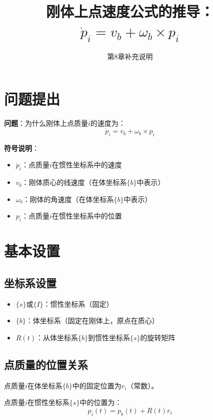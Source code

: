 \documentclass[12pt,a4paper]{article}
\title{刚体上点速度公式的推导：$\dot{p}_i = v_b + \omega_b \times p_i$}
\author{第8章补充说明}
\date{}
\begin{document}
\maketitle

\section{问题提出}

\textbf{问题}：为什么刚体上点质量$i$的速度为：
\begin{equation}
\dot{p}_i = v_b + \omega_b \times p_i
\label{eq:velocity_formula}
\end{equation}

\textbf{符号说明}：
\begin{itemize}
\item $\dot{p}_i$：点质量$i$在惯性坐标系中的速度
\item $v_b$：刚体质心的线速度（在体坐标系$\{b\}$中表示）
\item $\omega_b$：刚体的角速度（在体坐标系$\{b\}$中表示）
\item $p_i$：点质量$i$在惯性坐标系中的位置
\end{itemize}

\section{基本设置}

\subsection{坐标系设置}

\begin{itemize}
\item $\{s\}$或$\{I\}$：惯性坐标系（固定）
\item $\{b\}$：体坐标系（固定在刚体上，原点在质心）
\item $R(t)$：从体坐标系$\{b\}$到惯性坐标系$\{s\}$的旋转矩阵
\end{itemize}

\subsection{点质量的位置关系}

点质量$i$在体坐标系$\{b\}$中的固定位置为$r_i$（常数）。

点质量$i$在惯性坐标系$\{s\}$中的位置为：
\begin{equation}
p_i(t) = p_b(t) + R(t) r_i
\label{eq:position_relation}
\end{equation}
\end{document}

